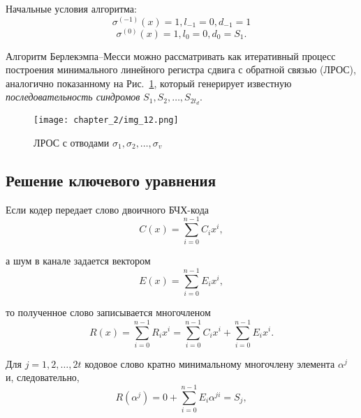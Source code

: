 Начальные условия алгоритма:
$$\sigma^{(-1)}(x)=1, l_{-1}=0, d_{-1}=1$$
$$\sigma^{(0)}(x)=1, l_0=0, d_{0}=S_1.$$

Алгоритм Берлекэмпа–Месси можно рассматривать как итеративный процесс построения минимального линейного
регистра сдвига с обратной связью (ЛРОС), аналогично показанному на Рис.~\ref{img_12}, который
генерирует известную \textit{последовательность синдромов} $S_1, S_2, \ldots, S_{2t_d}$.

\begin{figure}[htbp]
\begin{center}
\texttt{[image: chapter\_2/img\_12.png]}
\end{center}
\caption{ЛРОС с отводами $\sigma_1, \sigma_2, \ldots, \sigma_v$}
\label{img_12}
\end{figure}

\subsection{Решение ключевого уравнения}
%
Если кодер передает слово двоичного БЧХ-кода
$$C(x)=\sum\limits_{i=0}^{n-1} C_i x^i,$$

а шум в канале задается вектором
$$E(x)=\sum\limits_{i=0}^{n-1} E_i x^i,$$

то полученное слово записывается многочленом
$$R(x)=\sum\limits_{i=0}^{n-1} R_i x^i=\sum\limits_{i=0}^{n-1} C_i x^i+\sum\limits_{i=0}^{n-1} E_i x^i.$$

Для $j=1, 2, \ldots, 2t$ кодовое слово кратно минимальному многочлену элемента $\alpha^j$ и, следовательно,
$$R(\alpha^j)=0+\sum\limits_{i=0}^{n-1} E_i \alpha^{ji}=S_j,$$

